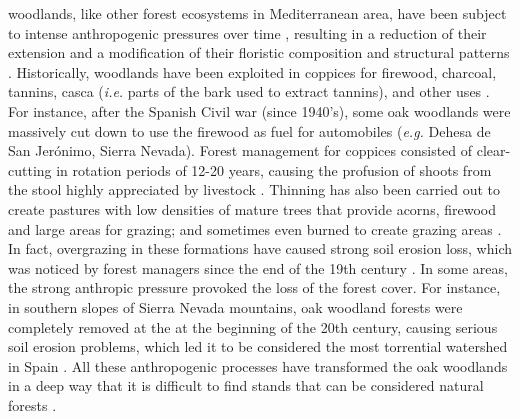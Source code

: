 \Qp woodlands, like other forest ecosystems in Mediterranean area, have been subject to intense anthropogenic pressures over time \autocite{GarciaJimenez20099230Robledales}, resulting in a reduction of their extension and a modification of their floristic composition \autocites{Serradaetal1992CoppiceSystem,Gavilanetal2000EffectsDisturbance,PerezLuqueetal2021EcologicalDiversity} and structural patterns \autocites{Calvoetal1999PostfireSuccession,Tarregaetal2006ForestStructure}. Historically, \Qp woodlands have been exploited in coppices for firewood, charcoal, tannins, casca (\emph{i.e.} parts of the bark used to extract tannins), and other uses \autocites{RuizdelaTorre2006FloraMayor,SanchezPalomaresetal2008EstacionesEcologicas}. For instance, after the Spanish Civil war (since 1940's), some oak woodlands were massively cut down to use the firewood as fuel for automobiles (\emph{e.g.} Dehesa de San Jerónimo, Sierra Nevada)\autocite{Prieto1975BosquesSierra}. Forest management for \Qp coppices consisted of clear-cutting in rotation periods of 12-20 years, causing the profusion of shoots from the stool highly appreciated by livestock \autocite{Bravoetal2008SelviculturaMontes}. Thinning has also been carried out to create pastures with low densities of mature trees that provide acorns, firewood and large areas for grazing; and sometimes even burned to create grazing areas \autocites{HerreraCalvo2016UsoPastoral,Alvarezetal2009CambiosEstructura,ValbuenaCarabanaGil2017CentenaryCoppicing}. In fact, overgrazing in these formations have caused strong soil erosion loss, which was noticed by forest managers since the end of the 19th century \autocites{Laguna1872ComisionFlora}. In some areas, the strong anthropic pressure provoked the loss of the forest cover. For instance, in southern slopes of Sierra Nevada mountains, oak woodland forests were completely removed at the at the beginning of the 20th century, causing serious soil erosion problems, which led it to be considered the most torrential watershed in Spain \autocites{RomeroZurbano1909DivisionHidrologicoforestal}. All these anthropogenic processes have transformed the oak woodlands in a deep way that it is difficult to find stands that can be considered natural forests \autocites{RuizdelaTorre2006FloraMayor}. 

